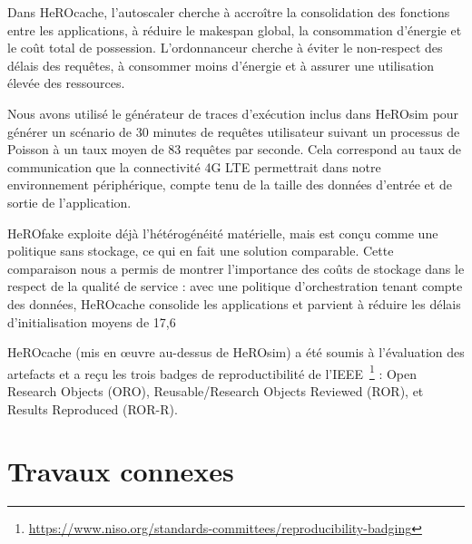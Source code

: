 Dans HeROcache, l'autoscaler cherche à accroître la consolidation des fonctions entre les applications, à réduire le makespan global, la consommation d'énergie et le coût total de possession. L'ordonnanceur cherche à éviter le non-respect des délais des requêtes, à consommer moins d'énergie et à assurer une utilisation élevée des ressources.

Nous avons utilisé le générateur de traces d'exécution inclus dans HeROsim pour générer un scénario de 30 minutes de requêtes utilisateur suivant un processus de Poisson à un taux moyen de 83 requêtes par seconde. Cela correspond au taux de communication que la connectivité 4G LTE permettrait dans notre environnement périphérique, compte tenu de la taille des données d'entrée et de sortie de l'application. 

HeROfake exploite déjà l'hétérogénéité matérielle, mais est conçu comme une politique sans stockage, ce qui en fait une solution comparable. Cette comparaison nous a permis de montrer l'importance des coûts de stockage dans le respect de la qualité de service : avec une politique d'orchestration tenant compte des données, HeROcache consolide les applications et parvient à réduire les délais d'initialisation moyens de 17,6 %

HeROcache (mis en œuvre au-dessus de HeROsim) a été soumis à l'évaluation des artefacts et a reçu les trois badges de reproductibilité de l'IEEE~\footnote{\href{https://www.niso.org/standards-committees/reproducibility-badging}{https://www.niso.org/standards-committees/reproducibility-badging}} : Open Research Objects (ORO), Reusable/Research Objects Reviewed (ROR), et Results Reproduced (ROR-R).

\section{Travaux connexes}
\label{section:herosim-sota}

